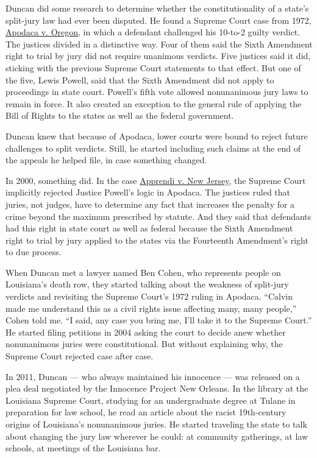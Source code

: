 Duncan did some research to determine whether the constitutionality of a
state's split-jury law had ever been disputed. He found a Supreme Court
case from 1972, \href{https://www.oyez.org/cases/1971/69-5046}{Apodaca
v. Oregon}, in which a defendant challenged his 10-to-2 guilty verdict.
The justices divided in a distinctive way. Four of them said the Sixth
Amendment right to trial by jury did not require unanimous verdicts.
Five justices said it did, sticking with the previous Supreme Court
statements to that effect. But one of the five, Lewis Powell, said that
the Sixth Amendment did not apply to proceedings in state court.
Powell's fifth vote allowed nonunanimous jury laws to remain in force.
It also created an exception to the general rule of applying the Bill of
Rights to the states as well as the federal government.

Duncan knew that because of Apodaca, lower courts were bound to reject
future challenges to split verdicts. Still, he started including such
claims at the end of the appeals he helped file, in case something
changed.

In 2000, something did. In the case
\href{https://www.oyez.org/cases/1999/99-478}{Apprendi v. New Jersey},
the Supreme Court implicitly rejected Justice Powell's logic in Apodaca.
The justices ruled that juries, not judges, have to determine any fact
that increases the penalty for a crime beyond the maximum prescribed by
statute. And they said that defendants had this right in state court as
well as federal because the Sixth Amendment right to trial by jury
applied to the states via the Fourteenth Amendment's right to due
process.

When Duncan met a lawyer named Ben Cohen, who represents people on
Louisiana's death row, they started talking about the weakness of
split-jury verdicts and revisiting the Supreme Court's 1972 ruling in
Apodaca. ``Calvin made me understand this as a civil rights issue
affecting many, many people,'' Cohen told me. ``I said, any case you
bring me, I'll take it to the Supreme Court.'' He started filing
petitions in 2004 asking the court to decide anew whether nonunanimous
juries were constitutional. But without explaining why, the Supreme
Court rejected case after case.

In 2011, Duncan --- who always maintained his innocence --- was released
on a plea deal negotiated by the Innocence Project New Orleans. In the
library at the Louisiana Supreme Court, studying for an undergraduate
degree at Tulane in preparation for law school, he read an article about
the racist 19th-century origins of Louisiana's nonunanimous juries. He
started traveling the state to talk about changing the jury law wherever
he could: at community gatherings, at law schools, at meetings of the
Louisiana bar.

